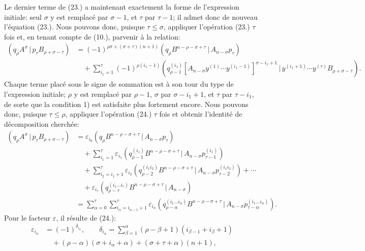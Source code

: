 \documentclass[11pt]{article}
\newcommand{\pair}[2]{(#1\,|\,#2)}
\newcommand{\eps}{\varepsilon}
\begin{document}
Le dernier terme de (23.) a maintenant exactement la forme de l'expression initiale: seul $\sigma$ y est remplacé par $\sigma-1$, et $\tau$ par $\tau-1$; il admet donc de nouveau l'équation (23.). Nous pouvons donc, puisque $\tau\le\sigma$, appliquer l'opération (23.) $\tau$ fois et, en tenant compte de (10.), parvenir à la relation:
\begin{equation}
\begin{aligned}
\pair{q_\rho A^\sigma}{p_\tau B_{\rho+\sigma-\tau}}
&=(-1)^{\rho\sigma+(\sigma+\tau)(n+1)}
  \pair{q_\rho B^{n-\rho-\sigma+\tau}}{A_{n-\sigma}p_\tau}\\
&\quad+\sum_{i_1=1}^{\tau}(-1)^{\rho(i_1-1)}
 \pair{q_{\rho-1}^{(i_1)}[A_{n-\sigma}y^{(1)}\cdots y^{(i_1-1)}]^{\sigma-i_1+1}}
 {y^{(i_1+1)}\cdots y^{(\tau)}B_{\rho+\sigma-\tau}}.
\end{aligned}
\tag{24}
\end{equation}
Chaque terme placé sous le signe de sommation est à son tour du type de l'expression initiale; $\rho$ y est remplacé par $\rho-1$, $\sigma$ par $\sigma-i_1+1$, et $\tau$ par $\tau-i_1$, de sorte que la condition 1) est satisfaite plus fortement encore. Nous pouvons donc, puisque $\tau\le\rho$, appliquer l'opération (24.) $\tau$ fois et obtenir l'identité de décomposition cherchée:
\begin{equation}
\begin{aligned}
\pair{q_\rho A^\sigma}{p_\tau B_{\rho+\sigma-\tau}}
&=\eps_{i_0}\pair{q_\rho B^{n-\rho-\sigma+\tau}}{A_{n-\sigma}p_\tau}\\
&\quad+\sum_{i_1=1}^{\tau}\eps_{i_1}
 \pair{q_{\rho-1}^{(i_1)}B^{n-\rho-\sigma+\tau}}{A_{n-\sigma}p_{\tau-1}^{(i_1)}}\\
&\quad+\sum_{i_2=i_1+1}^{\tau}\eps_{i_2}
 \pair{q_{\rho-2}^{(i_1i_2)}B^{n-\rho-\sigma+\tau}}{A_{n-\sigma}p_{\tau-2}^{(i_1i_2)}}+\cdots\\
&\quad+\eps_{i_\tau}\pair{q_{\rho-\tau}^{(i_1\ldots i_\tau)}B^{n-\rho-\sigma+\tau}}{A_{n-\sigma}}\\
&=\sum_{\alpha=0}^{\tau}\sum_{i_\alpha=i_{\alpha-1}+1}^{\tau}\eps_{i_\alpha}
 \pair{q_{\rho-\alpha}^{(i_1\ldots i_\alpha)}B^{n-\rho-\sigma+\tau}}{A_{n-\sigma}p_{\tau-\alpha}^{(i_1\ldots i_\alpha)}}.
\end{aligned}
\tag{25}
\end{equation}
Pour le facteur $\eps$, il résulte de (24.):
\begin{equation}
\begin{aligned}
\eps_{i_\alpha}&=(-1)^{\delta_{i_\alpha}},\qquad
\delta_{i_\alpha}=\sum_{\beta=1}^{\alpha}(\rho-\beta+1)(i_{\beta-1}+i_\beta+1)\\
&\quad +(\rho-\alpha)(\sigma+i_\alpha+\alpha)+(\sigma+\tau+\alpha)(n+1),
\end{aligned}
\tag{26}
\end{equation}
\end{document}
